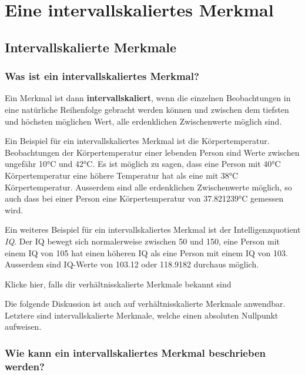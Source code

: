 \documentclass[
]{book}
\theoremstyle{definition}
\theoremstyle{definition}
\theoremstyle{definition}
\theoremstyle{definition}
\theoremstyle{remark}
\begin{document}
\part{Eine intervallskaliertes Merkmal}\label{part-eine-intervallskaliertes-merkmal}

\chapter{Intervallskalierte Merkmale}\label{intervallskalierte-merkmale}

\section{Was ist ein intervallskaliertes Merkmal?}\label{intervallskalierte-merkmale-definition}

\label{customdef-intervallskaliert}{Ein Merkmal ist dann \textbf{intervallskaliert}, wenn die einzelnen Beobachtungen in eine natürliche Reihenfolge gebracht werden können und zwischen dem tiefsten und höchsten möglichen Wert, alle erdenklichen Zwischenwerte möglich sind.}

Ein Beispiel für ein intervallskaliertes Merkmal ist die Körpertemperatur. Beobachtungen der Körpertemperatur einer lebenden Person sind Werte zwischen ungefähr 10°C und 42°C. Es ist möglich zu sagen, dass eine Person mit 40°C Körpertemperatur eine höhere Temperatur hat als eine mit 38°C Körpertemperatur. Ausserdem sind alle erdenklichen Zwischenwerte möglich, so auch dass bei einer Person eine Körpertemperatur von 37.821239°C gemessen wird.

Ein weiteres Beispiel für ein intervallskaliertes Merkmal ist der Intelligenzquotient \emph{IQ}. Der IQ bewegt sich normalerweise zwischen 50 und 150, eine Person mit einem IQ von 105 hat einen höheren IQ als eine Person mit einem IQ von 103. Ausserdem sind IQ-Werte von 103.12 oder 118.9182 durchaus möglich.

Klicke hier, falls dir verhältnisskalierte Merkmale bekannt sind

Die folgende Diskussion ist auch auf verhältnisskalierte Merkmale anwendbar. Letztere sind intervallskalierte Merkmale, welche einen absoluten Nullpunkt aufweisen.

\section{Wie kann ein intervallskaliertes Merkmal beschrieben werden?}\label{intervallskalierte-merkmale-beschreibung}
\end{document}
